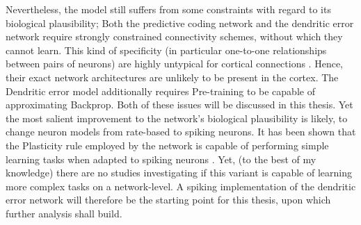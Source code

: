 Nevertheless, the model still suffers from some constraints with regard to its biological plausibility; Both the
predictive coding network and the dendritic error network require strongly constrained connectivity schemes, without
which they cannot learn. This kind of specificity (in particular one-to-one relationships between pairs of neurons) are
highly untypical for cortical connections \citep{Thomson2003}. Hence, their exact network architectures are unlikely to
be present in the cortex. The Dendritic error model additionally requires Pre-training to be capable of approximating
Backprop. Both of these issues will be discussed in this thesis. Yet the most salient improvement to the network's
biological plausibility is likely, to change neuron models from rate-based to spiking neurons. It has been shown that
the Plasticity rule employed by the network is capable of performing simple learning tasks when adapted to spiking
neurons \citep{Stapmanns2021}. Yet, (to the best of my knowledge) there are no studies investigating if this variant is
capable of learning more complex tasks on a network-level. A spiking implementation of the dendritic error network will
therefore be the starting point for this thesis, upon which further analysis shall build.

